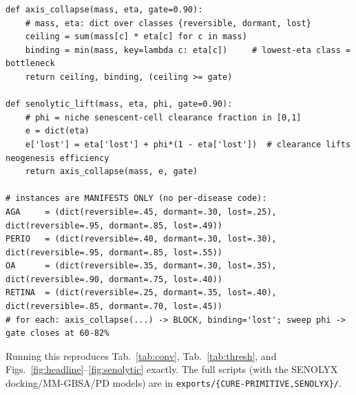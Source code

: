 \documentclass[11pt,a4paper]{article}
\begin{document}
\begin{lstlisting}[basicstyle=\ttfamily\footnotesize,frame=single,xleftmargin=0pt,breaklines=true]
def axis_collapse(mass, eta, gate=0.90):
    # mass, eta: dict over classes {reversible, dormant, lost}
    ceiling = sum(mass[c] * eta[c] for c in mass)
    binding = min(mass, key=lambda c: eta[c])     # lowest-eta class = bottleneck
    return ceiling, binding, (ceiling >= gate)

def senolytic_lift(mass, eta, phi, gate=0.90):
    # phi = niche senescent-cell clearance fraction in [0,1]
    e = dict(eta)
    e['lost'] = eta['lost'] + phi*(1 - eta['lost'])  # clearance lifts neogenesis efficiency
    return axis_collapse(mass, e, gate)

# instances are MANIFESTS ONLY (no per-disease code):
AGA     = (dict(reversible=.45, dormant=.30, lost=.25), dict(reversible=.95, dormant=.85, lost=.49))
PERIO   = (dict(reversible=.40, dormant=.30, lost=.30), dict(reversible=.95, dormant=.85, lost=.55))
OA      = (dict(reversible=.35, dormant=.30, lost=.35), dict(reversible=.90, dormant=.75, lost=.40))
RETINA  = (dict(reversible=.25, dormant=.35, lost=.40), dict(reversible=.85, dormant=.70, lost=.45))
# for each: axis_collapse(...) -> BLOCK, binding='lost'; sweep phi -> gate closes at 60-82%
\end{lstlisting}

\noindent Running this reproduces Tab.~\ref{tab:conv}, Tab.~\ref{tab:thresh}, and
Figs.~\ref{fig:headline}--\ref{fig:senolytic} exactly. The full scripts (with the SENOLYX
docking/MM-GBSA/PD models) are in \texttt{exports/\{CURE-PRIMITIVE,SENOLYX\}/}.



\end{document}
